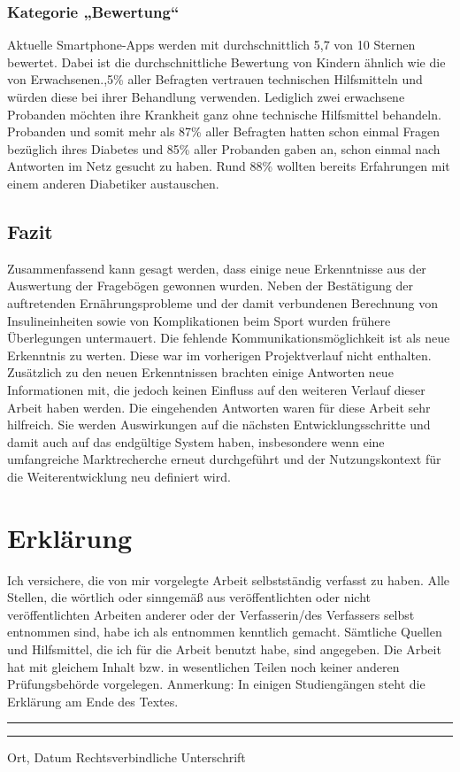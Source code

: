 \documentclass[a4paper,11pt]{article}%
\renewcommand{\\}{\vspace*{0.5\baselineskip} \newline}
\begin{document}
	\subsubsection{Kategorie „Bewertung“}
	Aktuelle Smartphone-Apps werden mit durchschnittlich 5,7 von 10 Sternen bewertet. Dabei ist die durchschnittliche Bewertung von Kindern ähnlich wie die von Erwachsenen.,5\% aller Befragten vertrauen technischen Hilfsmitteln und würden diese bei ihrer Behandlung verwenden. Lediglich zwei erwachsene Probanden möchten ihre Krankheit ganz ohne technische Hilfsmittel behandeln. Probanden und somit mehr als 87\% aller Befragten hatten schon einmal Fragen bezüglich ihres Diabetes und 85\% aller Probanden gaben an, schon einmal nach Antworten im Netz gesucht zu haben. Rund 88\% wollten bereits Erfahrungen mit einem anderen Diabetiker austauschen.
	\subsection{Fazit}
	Zusammenfassend kann gesagt werden, dass einige neue Erkenntnisse aus der Auswertung der Fragebögen gewonnen wurden. Neben der Bestätigung der auftretenden Ernährungsprobleme und der damit verbundenen Berechnung von Insulineinheiten sowie von Komplikationen beim Sport wurden frühere Überlegungen untermauert. Die fehlende Kommunikationsmöglichkeit ist als neue Erkenntnis zu werten. Diese war im vorherigen Projektverlauf nicht enthalten. Zusätzlich zu den neuen Erkenntnissen brachten einige Antworten neue Informationen mit, die jedoch keinen Einfluss auf den weiteren Verlauf dieser Arbeit haben werden. \\
	Die eingehenden Antworten waren für diese Arbeit sehr hilfreich. Sie werden Auswirkungen auf die nächsten Entwicklungsschritte und damit auch auf das endgültige System haben, insbesondere wenn eine umfangreiche Marktrecherche erneut durchgeführt und der Nutzungskontext für die Weiterentwicklung neu definiert wird.
	\newpage
	\appendix
	\section*{Erklärung}\addcontentsline{toc}{section}{Erklärung}
	Ich versichere, die von mir vorgelegte Arbeit selbstständig verfasst zu haben. Alle Stellen, die wörtlich oder sinngemäß aus veröffentlichten oder nicht veröffentlichten Arbeiten anderer oder der Verfasserin/des Verfassers selbst entnommen sind, habe ich als entnommen kenntlich gemacht. Sämtliche Quellen und Hilfsmittel, die ich für die Arbeit benutzt habe, sind angegeben. Die Arbeit hat mit gleichem Inhalt bzw. in wesentlichen Teilen noch keiner anderen Prüfungsbehörde vorgelegen.\\
	Anmerkung: In einigen Studiengängen steht die Erklärung am Ende des Textes.\\
	~\\
	~\\
	\rule{0.35\textwidth}{0.4pt} \hspace*{3cm} \rule{0.45\textwidth}{0.4pt} \newline
	Ort, Datum	\hspace*{6.3cm}	Rechtsverbindliche Unterschrift
	\newpage
\end{document}
